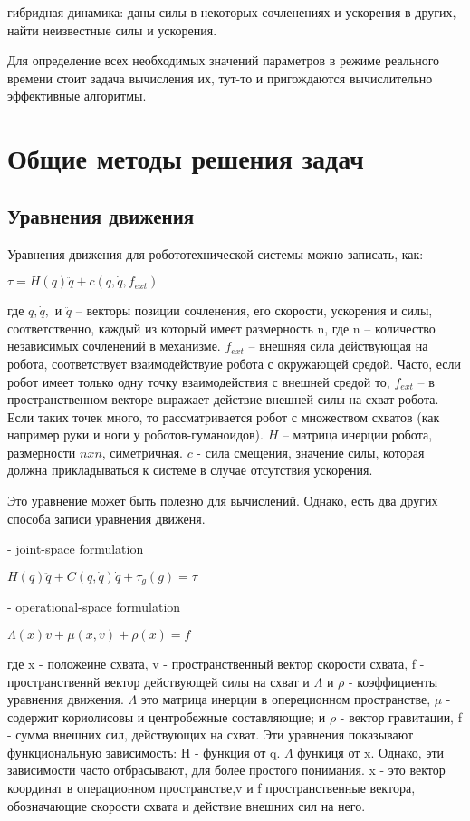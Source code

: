 \documentclass[a4paper,14pt]{extreport}
\begin{document}
гибридная динамика: даны силы в некоторых сочленениях и ускорения в других, найти неизвестные силы и ускорения.


Для определение всех необходимых значений параметров в режиме реального времени стоит задача вычисления их, тут-то и пригождаются вычислительно эффективные алгоритмы.

\newpage
\section{Общие методы решения задач}

\subsection{Уравнения движения}
Уравнения движения для робототехнической системы можно записать, как:

\begin{center}
	$\tau = H(q) \ddot q + c(q, \dot q, f_{ext})$
\end{center}

где $q, \dot q,$ и $\ddot q$ -- векторы позиции сочленения, его скорости, ускорения и силы, соответственно, каждый из который имеет размерность n, где n -- количество независимых сочленений в механизме. $f_{ext}$ -- внешняя сила действующая на робота, соответствует взаимодействуие робота с окружающей средой. Часто, если робот имеет только одну точку взаимодействия с внешней средой то, $f_{ext}$ -- в пространственном векторе выражает действие внешней силы на схват робота. Если таких точек много, то рассматривается робот с множеством схватов (как например руки и ноги у роботов-гуманоидов). $H$ -- матрица инерции робота, размерности $n  x n$, симетричная. $c$ - сила смещения, значение силы, которая должна прикладываться к системе в случае отсутствия ускорения.


Это уравнение может быть полезно для вычислений. Однако, есть два других способа записи уравнения движеня.

- joint-space formulation
\begin{center}
	$H(q) \ddot q + C(q, \dot q)\dot q + \tau_g (g) = \tau$	
\end{center}

- operational-space formulation
\begin{center}
	$\Lambda(x) v + \mu (x, v) + \rho (x) = f$
\end{center}

где x - положеине схвата, v - пространственный вектор скорости схвата, f - пространственнй вектор действующей силы на схват и $\Lambda$ и $\rho$ - коэффициенты уравнения движения. $\Lambda$ это матрица инерции в опереционном пространстве, $\mu$ - содержит кориолисовы и центробежные составляющие; и $\rho$ - вектор гравитации, f - сумма внешних сил, действующих на схват.
Эти уравнения показывают функциональную зависимость: H - функция от q. $\Lambda$ функиця от x. Однако, эти зависимости часто отбрасывают, для более простого понимания. x - это вектор координат в операционном пространстве,v и f пространственные вектора, обозначающие скорости схвата и действие внешних сил на него. 
\end{document}
